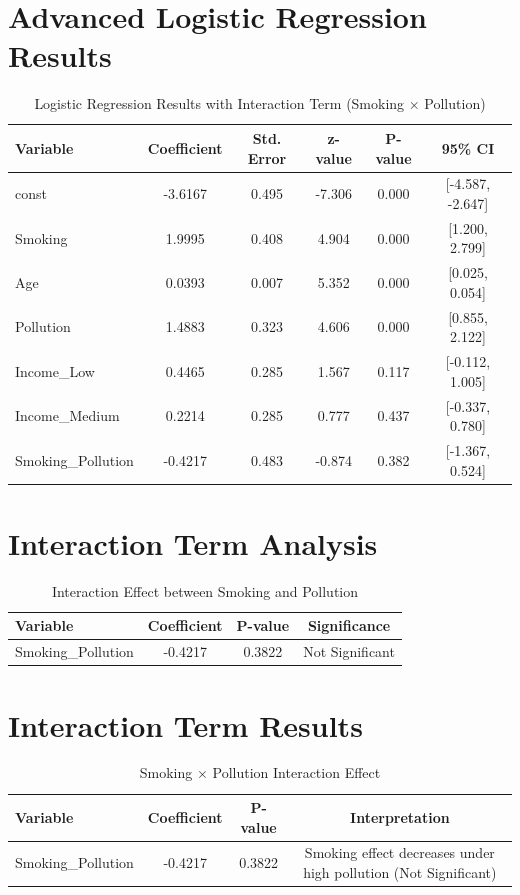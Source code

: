 \documentclass[12pt,a4paper]{report}
\begin{document}
\section*{Advanced Logistic Regression Results}

\begin{table}[h!]
\centering
\caption{Logistic Regression Results with Interaction Term (Smoking $\times$ Pollution)}
\begin{tabular}{lccccc}
\hline
\textbf{Variable} & \textbf{Coefficient} & \textbf{Std. Error} & \textbf{z-value} & \textbf{P-value} & \textbf{95\% CI} \\
\hline
const              & -3.6167 & 0.495 & -7.306 & 0.000 & [-4.587, -2.647] \\
Smoking            &  1.9995 & 0.408 &  4.904 & 0.000 & [1.200, 2.799] \\
Age                &  0.0393 & 0.007 &  5.352 & 0.000 & [0.025, 0.054] \\
Pollution          &  1.4883 & 0.323 &  4.606 & 0.000 & [0.855, 2.122] \\
Income\_Low        &  0.4465 & 0.285 &  1.567 & 0.117 & [-0.112, 1.005] \\
Income\_Medium     &  0.2214 & 0.285 &  0.777 & 0.437 & [-0.337, 0.780] \\
Smoking\_Pollution & -0.4217 & 0.483 & -0.874 & 0.382 & [-1.367, 0.524] \\
\hline
\end{tabular}
\end{table}
\section*{Interaction Term Analysis}

\begin{table}[h!]
\centering
\caption{Interaction Effect between Smoking and Pollution}
\begin{tabular}{lccc}
\hline
\textbf{Variable} & \textbf{Coefficient} & \textbf{P-value} & \textbf{Significance} \\
\hline
Smoking\_Pollution & -0.4217 & 0.3822 & Not Significant \\
\hline
\end{tabular}
\end{table}
\section*{Interaction Term Results}

\begin{table}[h!]
\centering
\caption{Smoking $\times$ Pollution Interaction Effect}
\begin{tabular}{lccc}
\hline
\textbf{Variable} & \textbf{Coefficient} & \textbf{P-value} & \textbf{Interpretation} \\
\hline
Smoking\_Pollution & -0.4217 & 0.3822 & Smoking effect decreases under high pollution (Not Significant) \\
\hline
\end{tabular}
\end{table}
\vspace{1CM}
\end{document}
